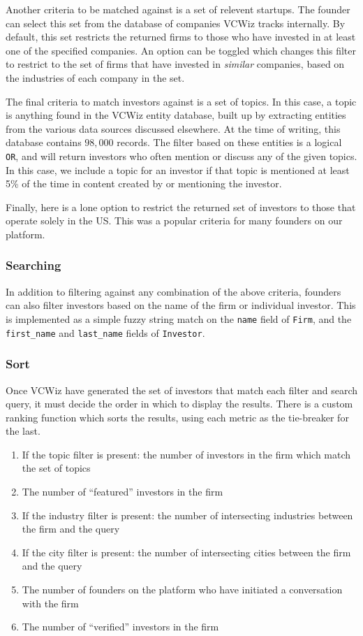 Another criteria to be matched against is a set of relevent startups. The founder can select this set from the database of companies VCWiz tracks internally. By default, this set restricts the returned firms to those who have invested in at least one of the specified companies. An option can be toggled which changes this filter to restrict to the set of firms that have invested in \textit{similar} companies, based on the industries of each company in the set.

The final criteria to match investors against is a set of topics. In this case, a topic is anything found in the VCWiz entity database, built up by extracting entities from the various data sources discussed elsewhere. At the time of writing, this database contains $98,000$ records. The filter based on these entities is a logical \texttt{OR}, and will return investors who often mention or discuss any of the given topics. In this case, we include a topic for an investor if that topic is mentioned at least 5\% of the time in content created by or mentioning the investor.

Finally, here is a lone option to restrict the returned set of investors to those that operate solely in the US. This was a popular criteria for many founders on our platform.

\subsubsection{Searching}

In addition to filtering against any combination of the above criteria, founders can also filter investors based on the name of the firm or individual investor. This is implemented as a simple fuzzy string match on the \texttt{name} field of \texttt{Firm}, and the \texttt{first\_name} and \texttt{last\_name} fields of \texttt{Investor}.

\subsubsection{Sort}

Once VCWiz have generated the set of investors that match each filter and search query, it must decide the order in which to display the results. There is a custom ranking function which sorts the results, using each metric as the tie-breaker for the last.

\begin{enumerate}
  \item If the topic filter is present: the number of investors in the firm which match the set of topics
  \item The number of ``featured'' investors in the firm
  \item If the industry filter is present: the number of intersecting industries between the firm and the query
  \item If the city filter is present: the number of intersecting cities between the firm and the query
  \item The number of founders on the platform who have initiated a conversation with the firm
  \item The number of ``verified'' investors in the firm
\end{enumerate}

